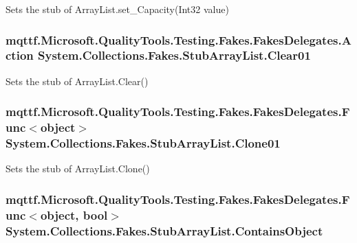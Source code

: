 Sets the stub of Array\-List.\-set\-\_\-\-Capacity(\-Int32 value)

\hypertarget{class_system_1_1_collections_1_1_fakes_1_1_stub_array_list_aff8258fd1ea86d867f45643df8cb0e96}{
\subsubsection[{Clear01}]{\setlength{\rightskip}{0pt plus 5cm}mqttf.\-Microsoft.\-Quality\-Tools.\-Testing.\-Fakes.\-Fakes\-Delegates.\-Action System.\-Collections.\-Fakes.\-Stub\-Array\-List.\-Clear01}}\label{class_system_1_1_collections_1_1_fakes_1_1_stub_array_list_aff8258fd1ea86d867f45643df8cb0e96}


Sets the stub of Array\-List.\-Clear()

\hypertarget{class_system_1_1_collections_1_1_fakes_1_1_stub_array_list_ac3abd8718b286b6287ead5dc6ce5e5f2}{
\subsubsection[{Clone01}]{\setlength{\rightskip}{0pt plus 5cm}mqttf.\-Microsoft.\-Quality\-Tools.\-Testing.\-Fakes.\-Fakes\-Delegates.\-Func$<$object$>$ System.\-Collections.\-Fakes.\-Stub\-Array\-List.\-Clone01}}\label{class_system_1_1_collections_1_1_fakes_1_1_stub_array_list_ac3abd8718b286b6287ead5dc6ce5e5f2}


Sets the stub of Array\-List.\-Clone()

\hypertarget{class_system_1_1_collections_1_1_fakes_1_1_stub_array_list_ab726442d4260de262bdcced35f63a372}{
\subsubsection[{Contains\-Object}]{\setlength{\rightskip}{0pt plus 5cm}mqttf.\-Microsoft.\-Quality\-Tools.\-Testing.\-Fakes.\-Fakes\-Delegates.\-Func$<$object, bool$>$ System.\-Collections.\-Fakes.\-Stub\-Array\-List.\-Contains\-Object}}\label{class_system_1_1_collections_1_1_fakes_1_1_stub_array_list_ab726442d4260de262bdcced35f63a372}


